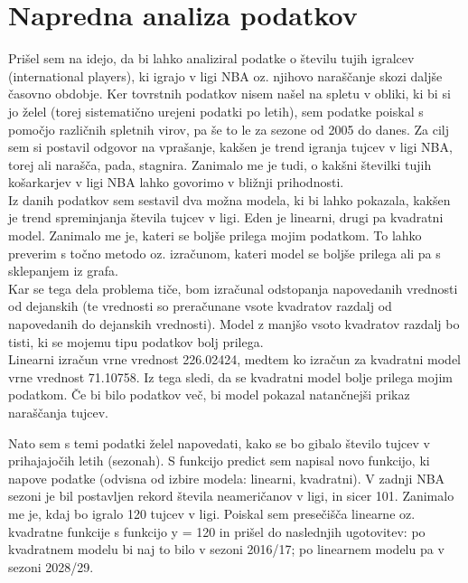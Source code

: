 \documentclass[11pt,a4paper]{article}
\begin{document}
\section{Napredna analiza podatkov}

Prišel sem na idejo, da bi lahko analiziral podatke o številu tujih igralcev (international players), ki igrajo v ligi NBA oz. njihovo naraščanje skozi daljše časovno obdobje. Ker tovrstnih podatkov nisem našel na spletu v obliki, ki bi si jo želel (torej sistematično urejeni podatki po letih), sem podatke poiskal s pomočjo različnih spletnih virov, pa še to le za sezone od 2005 do danes. Za cilj sem si postavil odgovor na vprašanje, kakšen je trend igranja tujcev v ligi NBA, torej ali narašča, pada, stagnira. Zanimalo me je tudi, o kakšni številki tujih košarkarjev v ligi NBA lahko govorimo v bližnji prihodnosti.\\

Iz danih podatkov sem sestavil dva možna modela, ki bi lahko pokazala, kakšen je trend spreminjanja števila tujcev v ligi. Eden je linearni, drugi pa kvadratni model. Zanimalo me je, kateri se boljše prilega mojim podatkom. 
To lahko preverim s točno metodo oz. izračunom, kateri model se boljše prilega ali pa s sklepanjem iz grafa. \\

Kar se tega dela problema tiče, bom izračunal odstopanja napovedanih vrednosti od dejanskih (te vrednosti so preračunane vsote kvadratov razdalj od napovedanih do dejanskih vrednosti). Model z manjšo vsoto kvadratov razdalj bo tisti, ki se mojemu tipu podatkov bolj prilega.\\

Linearni izračun vrne vrednost 226.02424, medtem ko izračun za kvadratni model vrne vrednost 71.10758. Iz tega sledi, da se kvadratni model bolje prilega mojim podatkom. Če bi bilo podatkov več, bi model pokazal natančnejši prikaz naraščanja tujcev.\\


Nato sem s temi podatki želel napovedati, kako se bo gibalo število tujcev v prihajajočih letih (sezonah). S funkcijo predict sem napisal novo funkcijo, ki napove podatke (odvisna od izbire modela: linearni, kvadratni). V zadnji NBA sezoni je bil postavljen rekord števila neameričanov v ligi, in sicer 101. Zanimalo me je, kdaj bo igralo 120 tujcev v ligi. Poiskal sem presečišča linearne oz. kvadratne funkcije s funkcijo y = 120 in prišel do naslednjih ugotovitev: po kvadratnem modelu bi naj to bilo v sezoni 2016/17;
po linearnem modelu pa v sezoni 2028/29.\\
\end{document}
